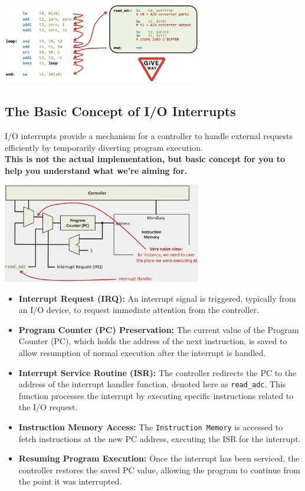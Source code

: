 \begin{center}
    \includegraphics[width=0.65\textwidth]{chapters/chapter2c/images/IOI.png}
\end{center}

\subsection{The Basic Concept of I/O Interrupts}

I/O interrupts provide a mechanism for a controller to handle external requests efficiently by temporarily diverting program execution. \\
\textbf{This is not the actual implementation, but basic concept for you to help you understand what we're aiming for.}
\begin{center}
    \includegraphics[width=0.65\textwidth]{chapters/chapter2c/images/basic_idea.png}
\end{center}

\begin{itemize}
    \item \textbf{Interrupt Request (IRQ):} An interrupt signal is triggered, typically from an I/O device, to request immediate attention from the controller.

    \item \textbf{Program Counter (PC) Preservation:} The current value of the Program Counter (PC), which holds the address of the next instruction, is saved to allow resumption of normal execution after the interrupt is handled.

    \item \textbf{Interrupt Service Routine (ISR):} The controller redirects the PC to the address of the interrupt handler function, denoted here as \texttt{read\_adc}. This function processes the interrupt by executing specific instructions related to the I/O request.

    \item \textbf{Instruction Memory Access:} The \texttt{Instruction Memory} is accessed to fetch instructions at the new PC address, executing the ISR for the interrupt.

    \item \textbf{Resuming Program Execution:} Once the interrupt has been serviced, the controller restores the saved PC value, allowing the program to continue from the point it was interrupted.
\end{itemize}


